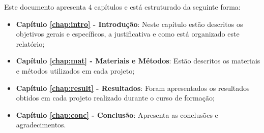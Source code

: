 Este documento apresenta $4$ capítulos e está estruturado da seguinte forma:

\begin{itemize}

  \item \textbf{Capítulo \ref{chap:intro} - Introdução}: Neste capítulo estão descritos os objetivos gerais e específicos, a justificativa e como está organizado este relatório;
  \item \textbf{Capítulo \ref{chap:mat} - Materiais e Métodos}: Estão descritos os materiais e métodos utilizados em cada projeto;
  \item \textbf{Capítulo \ref{chap:result} - Resultados}: Foram apresentados os resultados obtidos em cada projeto realizado durante o curso de formação;
  \item \textbf{Capítulo \ref{chap:conc} - Conclusão}: Apresenta as conclusões e agradecimentos.

\end{itemize}